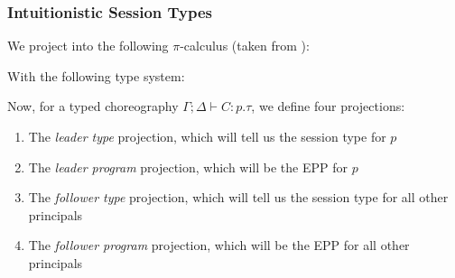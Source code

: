 \documentclass{article}
\theoremstyle{definition}
\newcommand{\proves}{\vdash}
\begin{document}
\subsubsection{Intuitionistic Session Types}
We project into the following $\pi$-calculus (taken from \citet{ToninhoCP12}):
\begin{syntax}
  \alternative{[y \leftrightarrow x]}
\end{syntax}
With the following type system:

Now, for a typed choreography $\Gamma; \Delta \proves C : p.\tau$, we define four projections:
\begin{enumerate}
\item The \emph{leader type} projection, which will tell us the session type for $p$
\item The \emph{leader program} projection, which will be the EPP for $p$
\item The \emph{follower type} projection, which will tell us the session type for all other principals
\item The \emph{follower program} projection, which will be the EPP for all other principals
\end{enumerate}
\end{document}
